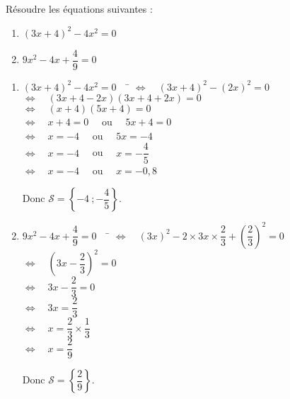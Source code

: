 \documentclass[a4paper,11pt,exos]{nsi} %
\begin{document}
\maketitle

\begin{exercice}
    Résoudre les équations suivantes :
    \begin{multicols}{2}
        \begin{enumerate}
            \item $(3x+4)^2-4x^2=0$
	        \item $9x^2-4x+\dfrac{4}{9}=0$
        \end{enumerate}
    \end{multicols}
    
\end{exercice}

\begin{enumerate}
    \item \begin{tabbing}
        $(3x+4)^2-4x^2=0 \quad$    \=  $\iff\quad (3x+4)^2-(2x)^2=0$\\
        \>  $\iff\quad  (3x+4-2x)(3x+4+2x)=0$\\
        \>  $\iff\quad  (x+4)(5x+4)=0$\\
        \>  $\iff\quad  x+4=0 \quad$ ou $\quad 5x+4=0$\\
        \>  $\iff\quad  x=-4\quad$ ou $\quad 5x = -4$\\
        \>  $\iff\quad  x=-4\quad$ ou $\quad x=-\dfrac{4}{5}$\\
        \>  $\iff\quad  x=-4\quad$ ou $\quad x=-0,8$
    \end{tabbing}
    Donc $\mathcal{S}=\left\{-4\ ;-\dfrac{4}{5} \right\}$.

    \item \begin{tabbing}
        $9x^2-4x+\dfrac{4}{9}=0 \quad$    \=  $\iff\quad \left(3x\right)^2-2\times 3x\times \dfrac{2}{3} +\left(\dfrac{2}{3}\right)^2=0$\\[.5em]
        \>  $\iff\quad  \left(3x-\dfrac{2}{3}\right)^2=0$\\[.5em]
        \>  $\iff\quad  3x-\dfrac{2}{3}=0$\\[.5em]
        \>  $\iff\quad  3x=\dfrac{2}{3}$\\[.5em]
        \>  $\iff\quad  x=\dfrac{2}{3}\times \dfrac{1}{3}$\\[.5em]
        \>  $\iff\quad  x=\dfrac{2}{9}$
    \end{tabbing}
    Donc $\mathcal{S}=\left\{\dfrac{2}{9} \right\}$.
\end{enumerate}
\end{document}
